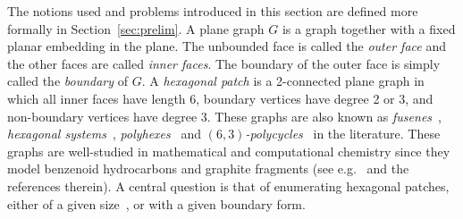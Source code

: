 \documentclass{llncs}
\begin{document}
The notions used and problems introduced in this section are defined more formally in Section~\ref{sec:prelim}.
A plane graph $G$ is a graph together with a fixed planar embedding in the plane. The unbounded face is called the {\em outer face} and the other faces are called {\em inner faces}. The boundary of the outer face is simply called the {\em boundary} of $G$.
A {\em hexagonal patch} is a 2-connected plane graph in which all inner faces have length 6, boundary vertices have degree 2 or 3, and non-boundary vertices have degree 3. These graphs are also known as {\em fusenes}~\cite{GHZ02}, {\em hexagonal systems}~\cite{DFG01}, {\em polyhexes}~\cite{Gra03} and {\em $(6,3)$-polycycles}~\cite{DDS08} in the literature. These graphs are well-studied in mathematical and computational chemistry since they model benzenoid hydrocarbons and graphite fragments (see e.g.~\cite{GHZ02} and the references therein). A central question is that of enumerating hexagonal patches, either of a given size~\cite{BCH03}, or with a given boundary form.
\end{document}
